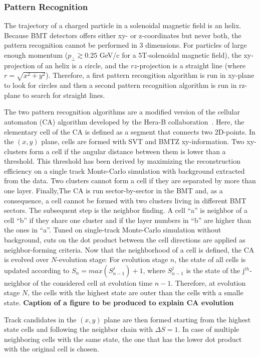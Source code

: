 \subsubsection{Pattern Recognition}
The trajectory of a charged particle in a solenoidal magnetic field is an helix. Because BMT detectors offers either
xy- or z-coordinates but never both, the pattern recognition cannot be performed in 3 dimensions. For particles of
large enough momentum ($p_\perp \gtrsim 0.25$ GeV/c for a 5T-solenoidal magnetic field), the xy-projection of an
helix is a circle, and the $rz$-projection is a straight line (where $r = \sqrt{x^2 + y^2}$). Therefore, a first
pattern recongition algorithm is run in xy-plane to look for circles and then a second pattern recognition algorithm is
run in rz-plane to search for straight lines.

The two pattern recognition algorithms are a modified version of the cellular automaton (CA) algorithm developed by the
Hera-B collaboration~\cite{CA-HeraB}. Here, the elementary cell of the CA is defined as a segment that connects two
2D-points.
In the $(x,y)$ plane, cells are formed with SVT and BMTZ xy-information. Two xy-clusters form a cell if the angular
distance between them is lower than a threshold. This threshold has been derived by maximizing the reconstruction
efficiency on a single track Monte-Carlo simulation with background extracted from the data. Two clusters cannot form a
cell if they are separated by more than one layer. Finally,The CA is run sector-by-sector in the BMT and, as a
consequence, a cell cannot be formed with two clusters living in different BMT sectors.
The subsequent step is the neighbor finding. A cell ``a'' is neighbor of a cell ``b'' if they share one cluster and if
the layer numbers in ``b'' are higher than the ones in ``a''. Tuned on single-track Monte-Carlo simulation without
background, cuts on the dot product between the cell directions are applied  as neighbor-forming criteria.
Now that the neighborhood of a cell is defined, the CA is evolved over $N$-evolution stage: For evolution stage $n$,
the state of all cells is updated according to $S_n = max(S_{n-1}^j) + 1$, where $S_{n-1}^j$ is the state of the
j$^{th}$-neighbor of the considered cell at evolution time $n-1$. Therefore, at evolution stage $N$, the cells with the
highest state are outer than the cells with a smalle state.
\color{red} \textbf{Caption of a figure to be produced to explain CA evolution} \color{black}

Track candidates in the $(x,y)$ plane are then formed starting from the highest state cells and following the neighbor
chain with $\Delta S = 1$. In case of multiple neighboring cells with the same state, the one that has the lower dot
product with the original cell is chosen.

